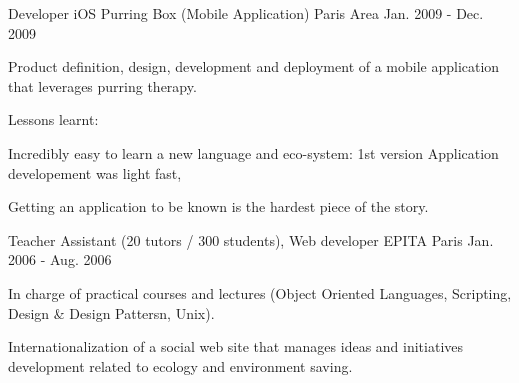 \begin{cventries}
  \cventry
    {Developer iOS} %
    {Purring Box (Mobile Application)} %
    {Paris Area} %
    {Jan. 2009 - Dec. 2009} %
    {
      \begin{cvitems} %
        \item {Product definition, design, development and deployment of a mobile application that leverages purring therapy.}
        \item {Lessons learnt:}
        \begin{cvsubitems}
          \item {Incredibly easy to learn a new language and eco-system: 1st version Application developement was light fast,}
          \item {Getting an application to be known is the hardest piece of the story.}
        \end{cvsubitems}
      \end{cvitems}
    }

  \cventry
    {Teacher Assistant (20 tutors / 300 students), Web developer} %
    {EPITA} %
    {Paris} %
    {Jan. 2006 - Aug. 2006} %
    {
      \begin{cvitems} %
        \item {In charge of practical courses and lectures (Object Oriented Languages, Scripting, Design \& Design Pattersn, Unix).}
        \item {Internationalization of a social web site that manages ideas and initiatives development related to ecology and environment saving.}
      \end{cvitems}
    }

\end{cventries}
